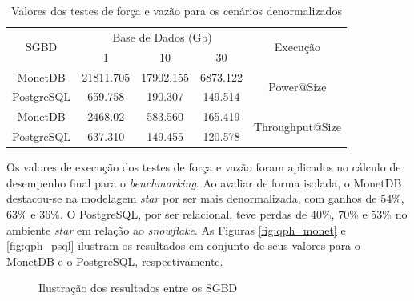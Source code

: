 \documentclass[12pt]{article}
\begin{document}
\begin{table}[htpb]
    \centering
    \caption{Valores dos testes de força e vazão para os cenários denormalizados}
    \label{tab:power-vazao-denormalizado}
    \begin{tabular}{c|ccc|c}
    \hline
    \multirow{2}{*}{SGBD} & \multicolumn{3}{c|}{Base de Dados (Gb)} & \multirow{2}{*}{Execução}        \\
                      & 1            & 10          & 30         &                                  \\ \hline
    MonetDB               & 21811.705    & 17902.155   & 6873.122   & \multirow{2}{*}{Power@Size}      \\
    PostgreSQL            & 659.758    & 190.307    & 149.514    &                                  \\ \hline
    MonetDB               & 2468.02      & 583.560     & 165.419    & \multirow{2}{*}{Throughput@Size} \\
    PostgreSQL            & 637.310      & 149.455     & 120.578    &                                  \\ \hline
    \end{tabular}
    \end{table}

Os valores de execução dos testes de força e vazão foram aplicados 
no cálculo de desempenho final para o \textit{benchmarking}. Ao avaliar de forma isolada,  
o MonetDB destacou-se na modelagem \textit{star} por ser mais denormalizada, com 
ganhos de 54\%, 63\% e 36\%.  
O PostgreSQL, por ser relacional, teve perdas de 40\%, 70\% e 53\% 
no ambiente \textit{star} em relação ao \textit{snowflake}. 
As Figuras \ref{fig:qph_monet} e \ref{fig:qph_psql} ilustram os resultados 
em conjunto de seus valores para o MonetDB e o PostgreSQL, respectivamente. 

\begin{figure}[htpb]
    \centering
    \caption{Ilustração dos resultados entre os SGBD}\label{fig:qph_sgbd}
\end{figure}
\end{document}
